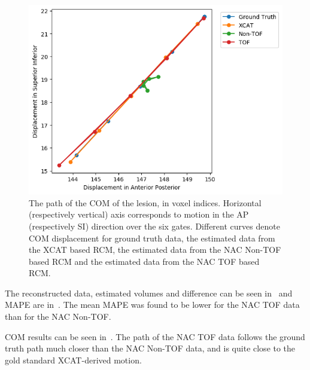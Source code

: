             \begin{figure}
                \centering
                
                \includegraphics[width=1.0\linewidth]{figures/motion_correction_1_results_1_TOF.png}
                
                \captionsetup{singlelinecheck=false}
                \caption{
                    The path of the \gls{COM} of the lesion, in voxel indices. Horizontal (respectively vertical) axis corresponds to motion in the \gls{AP} (respectively \gls{SI}) direction over the six gates. Different curves denote \gls{COM} displacement for ground truth data, the estimated data from the \gls{XCAT} based \gls{RCM}, the estimated data from the \gls{NAC} \gls{Non-TOF} based \gls{RCM} and the estimated data from the \gls{NAC} \gls{TOF} based \gls{RCM}.
                }
                \label{fig:impact_of_tof_on_respiratory_motion_model_estimation_using_pre_gated_no_intra_cycle_motion_nAC_pet_results_com_graph}
            \end{figure}
            
             The reconstructed data, estimated volumes and difference can be seen in~ and \gls{MAPE} are in~. The mean \gls{MAPE} was found to be lower for the \gls{NAC} \gls{TOF} data than for the \gls{NAC} \gls{Non-TOF}.
            
             \gls{COM} results can be seen in~. The path of the \gls{NAC} \gls{TOF} data follows the ground truth path much closer than the \gls{NAC} \gls{Non-TOF} data, and is quite close to the gold standard \gls{XCAT}-derived motion.
            
